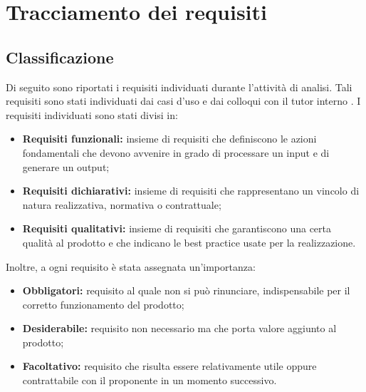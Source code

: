 \section{Tracciamento dei requisiti}\label{sec:tracciamento-dei-requisiti}

\setcounter{rowcount}{0}
\setcounter{subCount}{0}

\subsection{Classificazione}\label{subsec:classificazione}
Di seguito sono riportati i requisiti individuati durante l'attività di analisi.
Tali requisiti sono stati individuati dai casi d'uso e dai colloqui con il tutor interno \tutorAziendale.
I requisiti individuati sono stati divisi in:
\begin{itemize}
    \item \textbf{Requisiti funzionali:} insieme di requisiti che definiscono le azioni fondamentali che devono avvenire in grado di processare un input e di generare un output;
    \item \textbf{Requisiti dichiarativi:} insieme di requisiti che rappresentano un vincolo di natura realizzativa, normativa o contrattuale;
    \item \textbf{Requisiti qualitativi:} insieme di requisiti che garantiscono una certa qualità al prodotto e che indicano le best practice usate per la realizzazione.
\end{itemize}
Inoltre, a ogni requisito è stata assegnata un'importanza:
\begin{itemize}
    \item \textbf{Obbligatori:} requisito al quale non si può rinunciare, indispensabile per il corretto funzionamento del prodotto;
    \item \textbf{Desiderabile:} requisito non necessario ma che porta valore aggiunto al prodotto;
    \item \textbf{Facoltativo:} requisito che risulta essere relativamente utile oppure contrattabile con il proponente in un momento successivo.
\end{itemize}

